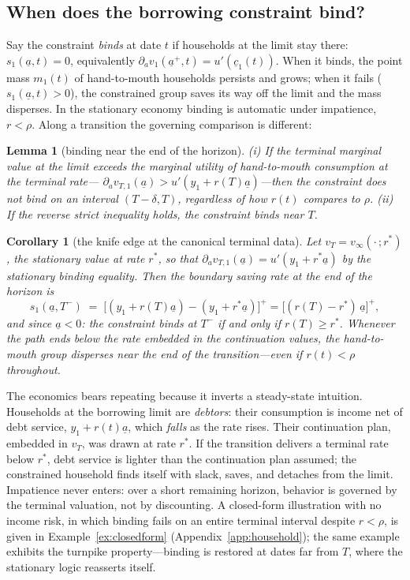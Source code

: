 \documentclass[11pt]{article}
\newtheorem{lemma}[theorem]{Lemma}
\newtheorem{corollary}[theorem]{Corollary}
\theoremstyle{definition}
\theoremstyle{remark}
\newcommand{\ubar}[1]{\underline{#1}}
\newcommand{\ubc}{\ubar{c}}
\newcommand{\uba}{\ubar{a}}
\begin{document}
\subsection{When does the borrowing constraint bind?}
\label{sec:binding}

Say the constraint \emph{binds} at date $t$ if households at the
limit stay there: $s_1(\uba,t)=0$, equivalently
$\partial_a v_1(\uba^+,t)=u'(\ubc_1(t))$. When it binds, the point
mass $m_1(t)$ of hand-to-mouth households persists and grows; when it
fails ($s_1(\uba,t)>0$), the constrained group saves its way off the
limit and the mass disperses. In the stationary economy binding is
automatic under impatience, $r<\rho$. Along a transition the
governing comparison is different:

\begin{lemma}[binding near the end of the horizon]\label{lem:binding}
(i) If the terminal marginal value at the limit exceeds the marginal
utility of hand-to-mouth consumption at the terminal rate---
$\partial_a v_{T,1}(\uba)>u'(y_1+r(T)\uba)$---then the constraint does
\emph{not} bind on an interval $(T-\delta,T)$, regardless of how
$r(t)$ compares to $\rho$. (ii) If the reverse strict inequality
holds, the constraint binds near $T$.
\end{lemma}

\begin{corollary}[the knife edge at the canonical terminal data]
\label{cor:knife}
Let $v_T=v_\infty(\cdot\,;r^*)$, the stationary value at rate
$r^*$, so that $\partial_a v_{T,1}(\uba)=u'(y_1+r^*\uba)$ by the
stationary binding equality. Then the boundary saving rate at the end
of the horizon is
\[
s_1(\uba,T^-)\;=\;\big[(y_1+r(T)\uba)-(y_1+r^*\uba)\big]^+
=\big[(r(T)-r^*)\,\uba\big]^+ ,
\]
and since $\uba<0$: \emph{the constraint binds at $T^-$ if and only if
$r(T)\ge r^*$}. Whenever the path ends below the rate embedded in the
continuation values, the hand-to-mouth group disperses near the end of
the transition---even if $r(t)<\rho$ throughout.
\end{corollary}

The economics bears repeating because it inverts a steady-state
intuition. Households at the borrowing limit are \emph{debtors}: their
consumption is income net of debt service, $y_1+r(t)\uba$, which
\emph{falls} as the rate rises. Their continuation plan, embedded in
$v_T$, was drawn at rate $r^*$. If the transition delivers a terminal
rate below $r^*$, debt service is lighter than the continuation plan
assumed; the constrained household finds itself with slack, saves, and
detaches from the limit. Impatience never enters: over a short
remaining horizon, behavior is governed by the terminal valuation, not
by discounting. A closed-form illustration with no income risk, in
which binding fails on an entire terminal interval despite $r<\rho$,
is given in Example~\ref{ex:closedform}
(Appendix~\ref{app:household}); the same example exhibits the turnpike
property---binding is restored at dates far from $T$, where the
stationary logic reasserts itself.
\end{document}
